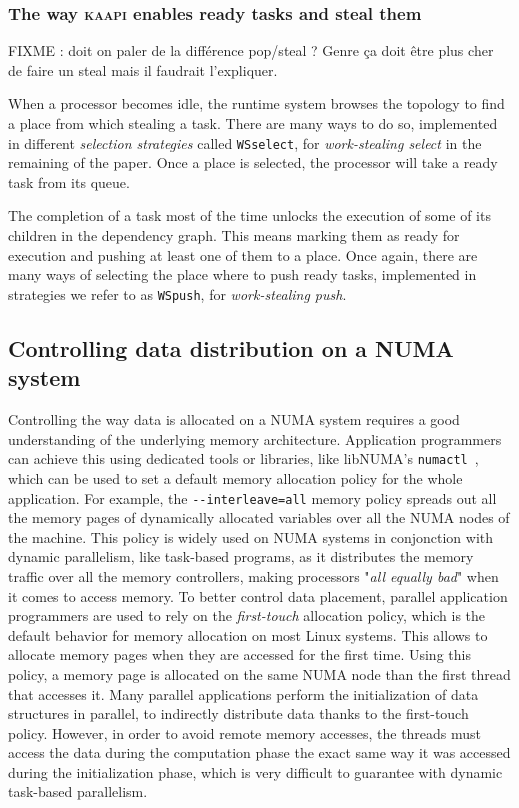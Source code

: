 \documentclass{Styles/llncs}
\newcommand{\kaapi}{\textsc{\mbox{kaapi}}\xspace}
\begin{document}
\subsubsection{The way \kaapi enables ready tasks and steal them}
FIXME : doit on paler de la différence pop/steal ? Genre ça doit être plus cher de
faire un steal mais il faudrait l'expliquer.

When a processor becomes idle, the runtime system browses the topology to find a place from which stealing a task.
There are many ways to do so, implemented in different \emph{selection strategies} called \verb/WSselect/, for \emph{work-stealing select} in the remaining of the paper.
Once a place is selected, the processor will take a ready task from its queue.

The completion of a task most of the time unlocks the execution of some of its children in the dependency graph.
This means marking them as ready for execution and pushing at least one of them to a place.
Once again, there are many ways of selecting the place where to push ready tasks, implemented in strategies we refer to as \verb/WSpush/, for \emph{work-stealing push}.

\subsection{Controlling data distribution on a NUMA system}
Controlling the way data is allocated on a NUMA system requires a good understanding of the underlying memory architecture.
Application programmers can achieve this using dedicated tools or libraries, like libNUMA's \verb!numactl!~\cite{DBLP:journals/corr/abs-1101-0093}, which can be used to set a default memory allocation policy for the whole application.
For example, the \verb!--interleave=all! memory policy spreads out all the memory pages of dynamically allocated variables over all the NUMA nodes of the machine.
This policy is widely used on NUMA systems in conjonction with dynamic parallelism, like task-based programs, as it distributes the memory traffic over all the memory controllers, making processors "\emph{all equally bad}" when it comes to access memory.
To better control data placement, parallel application programmers are used to rely on the \emph{first-touch} allocation policy, which is the default behavior for memory allocation on most Linux systems.
This allows to allocate memory pages when they are accessed for the first time.
Using this policy, a memory page is allocated on the same NUMA node than the first thread that accesses it.
Many parallel applications perform the initialization of data structures in parallel, to indirectly distribute data thanks to the first-touch policy.
However, in order to avoid remote memory accesses, the threads must access the data during the computation phase the exact same way it was accessed during the initialization phase, which is very difficult to guarantee with dynamic task-based parallelism.
\end{document}
